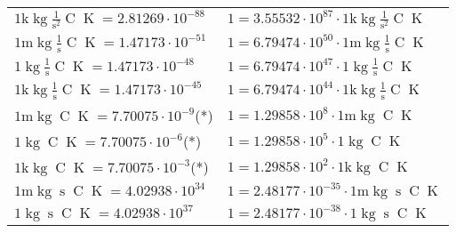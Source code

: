 \begin{center}
\begin{longtable}{l l}
{\color{gray}$1 \bm{\mathrm{ k}}\operatorname{kg}{}\frac1{\operatorname{s}^2}{\operatorname{C}}{\operatorname{K}} = 2.81269\cdot10^{-88} $}   & {\color{gray}$ 1 = 3.55532\cdot10^{87} \cdot 1 \bm{\mathrm{ k}}\operatorname{kg}{}\frac1{\operatorname{s}^2}{\operatorname{C}}{\operatorname{K}}$}  \\
{\color{gray}$1 \bm{\mathrm{ m}}\operatorname{kg}{}\frac1{\operatorname{s}}{\operatorname{C}}{\operatorname{K}} = 1.47173\cdot10^{-51} $}   & {\color{gray}$ 1 = 6.79474\cdot10^{50} \cdot 1 \bm{\mathrm{ m}}\operatorname{kg}{}\frac1{\operatorname{s}}{\operatorname{C}}{\operatorname{K}}$}  \\
{\color{black}$1 \bm{\mathrm{ }}\operatorname{kg}{}\frac1{\operatorname{s}}{\operatorname{C}}{\operatorname{K}} = 1.47173\cdot10^{-48} $}   & {\color{black}$ 1 = 6.79474\cdot10^{47} \cdot 1 \bm{\mathrm{ }}\operatorname{kg}{}\frac1{\operatorname{s}}{\operatorname{C}}{\operatorname{K}}$}  \\
{\color{gray}$1 \bm{\mathrm{ k}}\operatorname{kg}{}\frac1{\operatorname{s}}{\operatorname{C}}{\operatorname{K}} = 1.47173\cdot10^{-45} $}   & {\color{gray}$ 1 = 6.79474\cdot10^{44} \cdot 1 \bm{\mathrm{ k}}\operatorname{kg}{}\frac1{\operatorname{s}}{\operatorname{C}}{\operatorname{K}}$}  \\
{\color{gray}$1 \bm{\mathrm{ m}}\operatorname{kg}{}{}{\operatorname{C}}{\operatorname{K}} = 7.70075\cdot10^{-9} $}\quad(*) & {\color{gray}$ 1 = 1.29858\cdot10^{8} \cdot 1 \bm{\mathrm{ m}}\operatorname{kg}{}{}{\operatorname{C}}{\operatorname{K}}$}  \\
{\color{black}$1 \bm{\mathrm{ }}\operatorname{kg}{}{}{\operatorname{C}}{\operatorname{K}} = 7.70075\cdot10^{-6} $}\quad(*) & {\color{black}$ 1 = 1.29858\cdot10^{5} \cdot 1 \bm{\mathrm{ }}\operatorname{kg}{}{}{\operatorname{C}}{\operatorname{K}}$}  \\
{\color{gray}$1 \bm{\mathrm{ k}}\operatorname{kg}{}{}{\operatorname{C}}{\operatorname{K}} = 7.70075\cdot10^{-3} $}\quad(*) & {\color{gray}$ 1 = 1.29858\cdot10^{2} \cdot 1 \bm{\mathrm{ k}}\operatorname{kg}{}{}{\operatorname{C}}{\operatorname{K}}$}  \\
{\color{gray}$1 \bm{\mathrm{ m}}\operatorname{kg}{}{\operatorname{s}}{\operatorname{C}}{\operatorname{K}} = 4.02938\cdot10^{34} $}   & {\color{gray}$ 1 = 2.48177\cdot10^{-35} \cdot 1 \bm{\mathrm{ m}}\operatorname{kg}{}{\operatorname{s}}{\operatorname{C}}{\operatorname{K}}$}  \\
{\color{black}$1 \bm{\mathrm{ }}\operatorname{kg}{}{\operatorname{s}}{\operatorname{C}}{\operatorname{K}} = 4.02938\cdot10^{37} $}   & {\color{black}$ 1 = 2.48177\cdot10^{-38} \cdot 1 \bm{\mathrm{ }}\operatorname{kg}{}{\operatorname{s}}{\operatorname{C}}{\operatorname{K}}$}  \\

\end{longtable}
\end{center}
